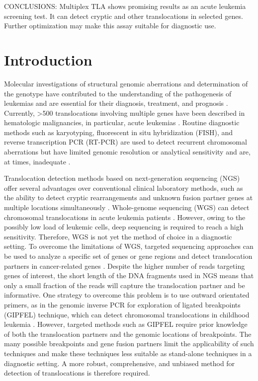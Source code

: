 CONCLUSIONS: Multiplex TLA shows promising results as an acute leukemia screening test. 
It can detect cryptic and other translocations in selected genes. 
Further optimization may make this assay suitable for diagnostic use.  

\section{Introduction}\label{introduction}
Molecular investigations of structural genomic aberrations and determination of the genotype have contributed to the understanding of the pathogenesis of leukemias and are essential for their diagnosis, treatment, and prognosis \cite{Shaffer_2012}.
Currently, \textgreater 500 translocations involving multiple genes have been described in hematologic malignancies, in particular, acute leukemias \cite{Mitelman_2017}. 
Routine diagnostic methods such as karyotyping, fluorescent in situ hybridization (FISH), and reverse transcription PCR (RT-PCR) are used to detect recurrent chromosomal aberrations but have limited genomic resolution or analytical sensitivity and are, at times, inadequate \cite{Sandberg_2010}.

Translocation detection methods based on next-generation sequencing (NGS) offer several advantages over conventional clinical laboratory methods, such as the ability to detect cryptic rearrangements and unknown fusion partner genes at multiple locations simultaneously \cite{Mertens_2015}.
Whole-genome sequencing (WGS) can detect chromosomal translocations in acute leukemia patients \cite{Welch_2011}. 
However, owing to the possibly low load of leukemic cells, deep sequencing is required to reach a high sensitivity.
Therefore, WGS is not yet the method of choice in a diagnostic setting. 
To overcome the limitations of WGS, targeted sequencing approaches can be used to analyze a specific set of genes or gene regions and detect translocation partners in cancer-related genes \cite{Duncavage_2012}.
Despite the higher number of reads targeting genes of interest, the short length of the DNA fragments used in NGS means that only a small fraction of the reads will capture the translocation partner and be informative.
One strategy to overcome this problem is to use outward orientated primers, as in the genomic inverse PCR for exploration of ligated breakpoints (GIPFEL) technique, which can detect chromosomal translocations in childhood leukemia \cite{Fueller_2014}.
However, targeted methods such as GIPFEL require prior knowledge of both the translocation partners and the genomic locations of breakpoints. 
The many possible breakpoints and gene fusion partners limit the applicability of such techniques and make these techniques less suitable as stand-alone techniques in a diagnostic setting. 
A more robust, comprehensive, and unbiased method for detection of translocations is therefore required. 


